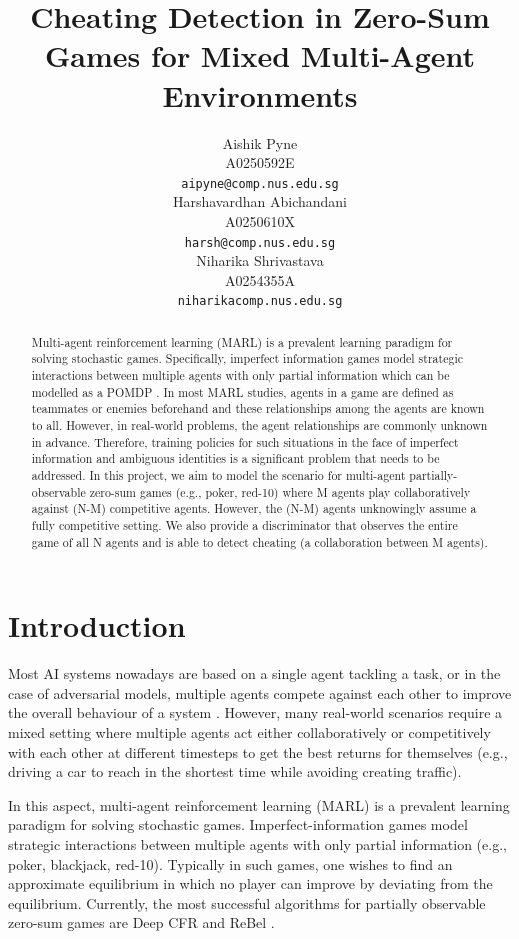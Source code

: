 \documentclass{article}
\title{Cheating Detection in Zero-Sum Games for Mixed Multi-Agent Environments}
\author{%
  Aishik Pyne \\
  A0250592E\\
  \texttt{aipyne@comp.nus.edu.sg} \\
  \And
   Harshavardhan Abichandani \\
  A0250610X\\
  \texttt{harsh@comp.nus.edu.sg} \\
  \And
   Niharika Shrivastava\\
  A0254355A\\
  \texttt{niharikacomp.nus.edu.sg} \\
}
\begin{document}
\maketitle

\begin{abstract}

Multi-agent reinforcement learning (MARL) is a prevalent learning paradigm for solving stochastic games. Specifically, imperfect information games model strategic interactions between multiple agents with only partial information which can be modelled as a POMDP \cite{pomdp:blog}. In most MARL studies, agents in a game are defined as teammates or enemies beforehand and these relationships among the agents are known to all. However, in real-world problems, the agent relationships are commonly unknown in advance. Therefore, training policies for such situations in the face of imperfect information and ambiguous identities is a significant problem that needs to be addressed. In this project, we aim to model the scenario for multi-agent partially-observable zero-sum games (e.g., poker, red-10) where M agents play collaboratively against (N-M) competitive agents. However, the (N-M) agents unknowingly assume a fully competitive setting. We also provide a discriminator that observes the entire game of all N agents and is able to detect cheating (a collaboration between M agents).

\end{abstract}

\section{Introduction}

Most AI systems nowadays are based on a single agent tackling a task, or in the case of adversarial models, multiple agents compete against each other to improve the overall behaviour of a system \cite{marl:blog}. However, many real-world scenarios require a mixed setting where multiple agents act either collaboratively or competitively with each other at different timesteps to get the best returns for themselves (e.g., driving a car to reach in the shortest time while avoiding creating traffic). 

In this aspect, multi-agent reinforcement learning (MARL) is a prevalent learning paradigm for solving stochastic games. Imperfect-information games model strategic interactions between multiple agents with only partial information (e.g., poker, blackjack, red-10). Typically in such games, one wishes to find an approximate equilibrium in which no player can improve by deviating from the equilibrium. Currently, the most successful algorithms for partially observable zero-sum games are Deep CFR \cite{dcfr:2018} and ReBel \cite{rebel:2020}. 
\end{document}
